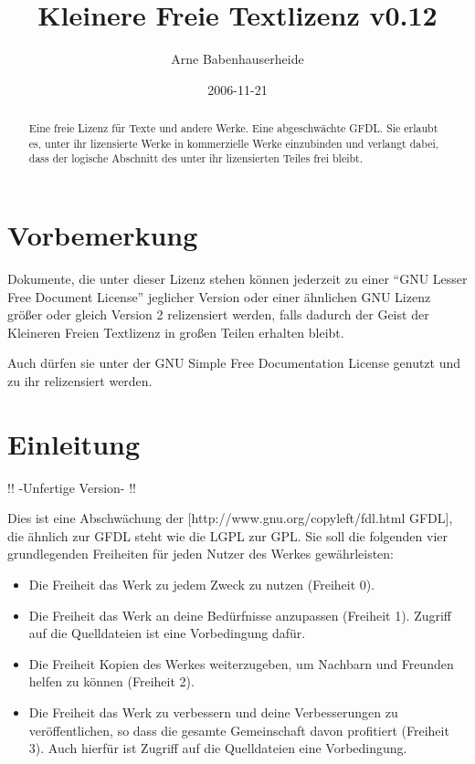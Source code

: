 \documentclass[a4paper,10pt]{scrartcl}
\title{Kleinere Freie Textlizenz v0.12}
\author{Arne Babenhauserheide}
\date{2006-11-21}
\begin{document}
\maketitle

\begin{abstract}

Eine freie Lizenz für Texte und andere Werke. Eine abgeschwächte GFDL. Sie erlaubt es, unter ihr lizensierte Werke in kommerzielle Werke einzubinden und verlangt dabei, dass der logische Abschnitt des unter ihr lizensierten Teiles frei bleibt. 

\end{abstract}

\section{Vorbemerkung}

Dokumente, die unter dieser Lizenz stehen können jederzeit zu einer "`GNU Lesser Free Document License"' jeglicher Version oder einer ähnlichen GNU Lizenz größer oder gleich Version 2 relizensiert werden, falls dadurch der Geist der Kleineren Freien Textlizenz in großen Teilen erhalten bleibt. 

Auch dürfen sie unter der GNU Simple Free Documentation License genutzt und zu ihr relizensiert werden. 

\section{Einleitung}

!! -Unfertige Version- !!

Dies ist eine Abschwächung der [http://www.gnu.org/copyleft/fdl.html GFDL], die ähnlich zur GFDL steht wie die LGPL zur GPL. Sie soll die folgenden vier grundlegenden Freiheiten für jeden Nutzer des Werkes gewährleisten: 

\begin{itemize}
 \item Die Freiheit das Werk zu jedem Zweck zu nutzen (Freiheit 0). 
 \item Die Freiheit das Werk an deine Bedürfnisse anzupassen (Freiheit 1). Zugriff auf die Quelldateien ist eine Vorbedingung dafür. 
 \item Die Freiheit Kopien des Werkes weiterzugeben, um Nachbarn und Freunden helfen zu können (Freiheit 2). 
 \item Die Freiheit das Werk zu verbessern und deine Verbesserungen zu veröffentlichen, so dass die gesamte Gemeinschaft davon profitiert (Freiheit 3). Auch hierfür ist Zugriff auf die Quelldateien eine Vorbedingung. 
\end{itemize}
\end{document}
